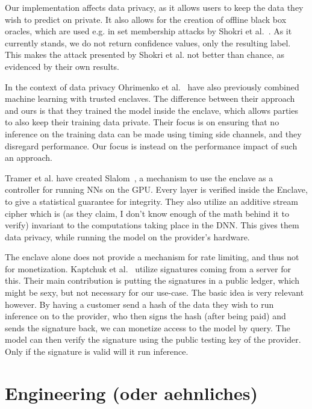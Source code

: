 \documentclass[11pt,twocolumn]{article}
\begin{document}
Our implementation affects data privacy, as it allows users to keep the data they wish to predict on private.
It also allows for the creation of offline black box oracles, which are used e.g. in set membership attacks by Shokri et al.~\cite{shokri_membership_2017}.
As it currently stands, we do not return confidence values, only the resulting label.
This makes the attack presented by Shokri et al. not better than chance, as evidenced by their own results.

In the context of data privacy Ohrimenko et al.~\cite{ohrimenko_oblivious_2016} have also previously combined machine learning with trusted enclaves.
The difference between their approach and ours is that they trained the model inside the enclave, which allows parties to also keep their training data private.
Their focus is on ensuring that no inference on the training data can be made using timing side channels, and they disregard performance.
Our focus is instead on the performance impact of such an approach.

Tramer et al. have created Slalom~\cite{tramer_slalom_2019}, a mechanism to use the enclave as a controller for running NNs on the GPU.
Every layer is verified inside the Enclave, to give a statistical guarantee for integrity.
They also utilize an additive stream cipher which is (as they claim, I don't know enough of the math behind it to verify) invariant to the computations taking place in the DNN.
This gives them data privacy, while running the model on the provider's hardware.

The enclave alone does not provide a mechanism for rate limiting, and thus not for monetization.
Kaptchuk et al.~\cite{kaptchuk_giving_nodate} utilize signatures coming from a server for this.
Their main contribution is putting the signatures in a public ledger, which might be sexy, but not necessary for our use-case.
The basic idea is very relevant however.
By having a customer send a hash of the data they wish to run inference on to the provider, who then signs the hash (after being paid) and sends the signature back, we can monetize access to the model by query.
The model can then verify the signature using the public testing key of the provider.
Only if the signature is valid will it run inference.

\section{Engineering (oder aehnliches)}
\label{sec:engineering}
\end{document}
